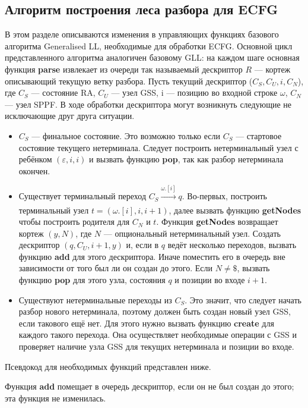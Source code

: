 \subsection{Алгоритм построения леса разбора для ECFG}
В этом разделе описываются изменения в управляющих функциях базового алгоритма 
Generalised LL, необходимые для обработки ECFG. Основной цикл 
представленного алгоритма аналогичен базовому
GLL: на каждом шаге основная функция \textbf{parse} извлекает из очереди так называемый дескриптор
$R$ --- кортеж описывающий текущую ветку разбора. Пусть текущий дескриптор ($C_S, C_U, i, C_N$),
где $C_S$ --- состояние RA, $C_U$ --- узел GSS, i --- позицию во входной строке 
$\omega$, $C_N$ --- узел SPPF. В ходе обработки дескриптора могут возникнуть следующие
не исключающие друг друга ситуации.
\begin{itemize} 
	\item $C_S$ --- финальное состояние. Это возможно только если $C_S$
	--- стартовое состояние текущего нетерминала. Следует построить нетерминальный
	узел с ребёнком $(\varepsilon, i, i)$ и вызвать функцию \textbf{pop}, так как
	разбор нетерминала окончен.
	
	\item Существует терминальный переход $C_S \xrightarrow[]{\omega.[i]} q$.
	Во-первых, построить терминальный узел $ t = (\omega.[i], i, i+1) $, далее 
	вызвать функцию \textbf{getNodes} чтобы построить родителя для $ C_N $ и $ t $. 
	Функция \textbf{getNodes} возвращает кортеж $ (y, N) $, где $N$ --- опциональный
	нетерминальный узел. Создать дескриптор $ (q, C_U, i+1, y) $ и, если
	в $q$ ведёт несколько переходов, вызвать функцию \textbf{add} для этого дескриптора.
	Иначе поместить его в очередь вне зависимости от того был ли он создан до этого. 
	Если $ N \neq \$$,
	вызвать функцию \textbf{pop} для этого узла, состояния $ q $ и позиции во
	входе $ i + 1 $.
	
	\item Существуют нетерминальные переходы из $C_S$.
	Это значит, что следует начать разбор нового нетерминала, поэтому должен быть
	создан новый узел GSS, если такового ещё нет. Для этого нужно вызвать функцию
	\textbf{create} для каждого такого перехода. Она осуществляет необходимые
	операции с GSS и проверяет наличие узла GSS для текущих нетерминала и 
	позиции во входе.
\end{itemize}
Псевдокод для необходимых функций представлен ниже.

Функция \textbf{add} помещает в очередь дескриптор, если он не был создан до этого; эта функция не изменилась.


